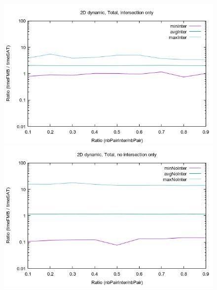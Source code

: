 \documentclass[12pt, a4paper]{article}
\begin{document}
\begin{center}
\begin{figure}[H]
\centering\includegraphics[width=12cm]{../Results/qualification2DTimeinter.png}\\
\centering\includegraphics[width=12cm]{../Results/qualification2DTimenointer.png}\\
\end{figure}
\end{center}
\end{document}
